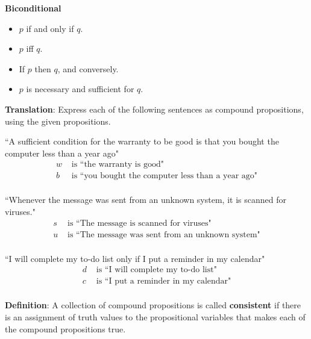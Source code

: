 \documentclass[12pt, oneside]{article}
\begin{document}
{\bf Biconditional}

\vspace{-20pt}
\begin{itemize}
    \item $p$ if and only if $q$.
    \item $p$ iff $q$.
    \item If $p$ then $q$, and conversely.
    \item $p$ is necessary and sufficient for $q$.
\end{itemize} \newpage
\newpage


{\bf Translation}: Express each of the following sentences as compound propositions, using
the given propositions.

\begin{multicols}{2}
``A sufficient condition for the warranty to be good is that you bought the computer less than a year ago"
\columnbreak
\begin{align*}
w &\text{ is  ``the warranty is good"} \\
b &\text{ is  ``you bought the computer less than a year ago"} \\
\end{align*}
\end{multicols}
\vfill

\begin{multicols}{2}
``Whenever the message was sent from an unknown system, it is scanned for viruses."
\columnbreak
\begin{align*}
s &\text{ is  ``The message is scanned for viruses"} \\
u &\text{ is  ``The message was sent from an unknown system"} \\
\end{align*}
\end{multicols}
\vfill

\begin{multicols}{2}
``I will complete my to-do list only if I put a reminder in my calendar"
\columnbreak
\begin{align*}
d &\text{ is  ``I will complete my to-do list"} \\
c &\text{ is  ``I put a reminder in my calendar"} \\
\end{align*}
\end{multicols}
\vfill \newpage


{\bf Definition}: A collection of  compound  propositions
is called {\bf consistent} if  there
is  an assignment  of  truth values
to  the  propositional variables that makes
each of the compound propositions  true.
 
\end{document}
